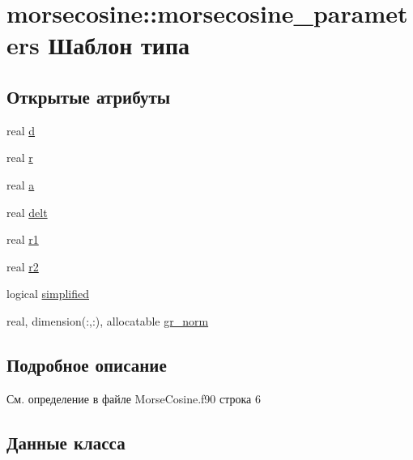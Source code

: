 \hypertarget{structmorsecosine_1_1morsecosine__parameters}{}\section{morsecosine\+:\+:morsecosine\+\_\+parameters Шаблон типа}
\label{structmorsecosine_1_1morsecosine__parameters}
\subsection*{Открытые атрибуты}
\begin{DoxyCompactItemize}
\item 
real \mbox{\hyperlink{structmorsecosine_1_1morsecosine__parameters_a9a09662917211e9fa6ff2dab431a3c92}{d}}
\item 
real \mbox{\hyperlink{structmorsecosine_1_1morsecosine__parameters_a495ad7f513ca1de9d7b787f30e3ef2eb}{r}}
\item 
real \mbox{\hyperlink{structmorsecosine_1_1morsecosine__parameters_a3e46242bfc11d79ff61508aeb88e9e49}{a}}
\item 
real \mbox{\hyperlink{structmorsecosine_1_1morsecosine__parameters_ada67ab5ff0a4ab310b30659b6e5211bf}{delt}}
\item 
real \mbox{\hyperlink{structmorsecosine_1_1morsecosine__parameters_a7f8065185b392cf54e6fe907f3c8b0a0}{r1}}
\item 
real \mbox{\hyperlink{structmorsecosine_1_1morsecosine__parameters_a1f4303be6bd7242b983280562b178c9e}{r2}}
\item 
logical \mbox{\hyperlink{structmorsecosine_1_1morsecosine__parameters_a5a328e79441e4a4fa2c24603afb41511}{simplified}}
\item 
real, dimension(\+:,\+:), allocatable \mbox{\hyperlink{structmorsecosine_1_1morsecosine__parameters_a1ef5624661236299c7c50a1e3b9155ca}{gr\+\_\+norm}}
\end{DoxyCompactItemize}


\subsection{Подробное описание}


См. определение в файле Morse\+Cosine.\+f90 строка 6



\subsection{Данные класса}
\mbox{\label{structmorsecosine_1_1morsecosine__parameters_a3e46242bfc11d79ff61508aeb88e9e49}} 
